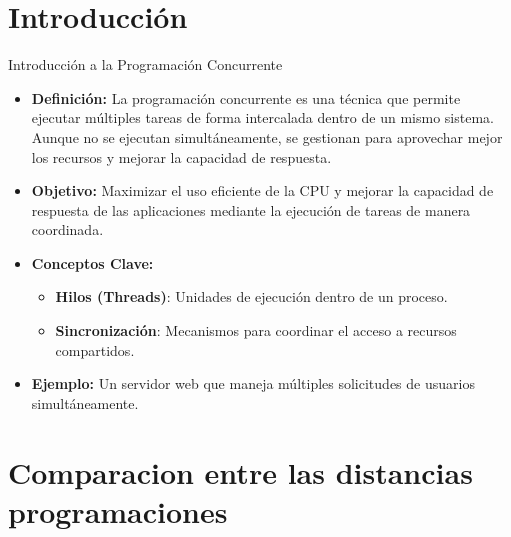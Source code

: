 \documentclass{beamer}
\begin{document}
\section{Introducción }
\begin{frame}{Introducción a la Programación Concurrente}
\begin{block}
    

    \begin{itemize}
        \item \textbf{Definición:} 
            La programación concurrente es una técnica que permite ejecutar múltiples tareas de forma intercalada dentro de un mismo sistema. Aunque no se ejecutan simultáneamente, se gestionan para aprovechar mejor los recursos y mejorar la capacidad de respuesta.\pause
        \item \textbf{Objetivo:} 
            Maximizar el uso eficiente de la CPU y mejorar la capacidad de respuesta de las aplicaciones mediante la ejecución de tareas de manera coordinada.\pause
        \item \textbf{Conceptos Clave:}
            \begin{itemize}
                \item \textbf{Hilos (Threads)}: Unidades de ejecución dentro de un proceso.
                \item \textbf{Sincronización}: Mecanismos para coordinar el acceso a recursos compartidos.\pause
            \end{itemize}
        \item \textbf{Ejemplo:} 
            Un servidor web que maneja múltiples solicitudes de usuarios simultáneamente.
    \end{itemize}
    \end{block}
\end{frame}


\section{Comparacion entre las distancias programaciones}
\end{document}
